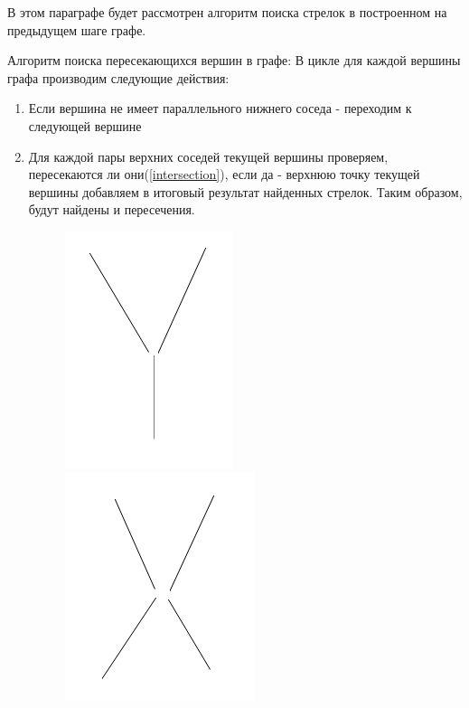В этом параграфе будет рассмотрен алгоритм поиска стрелок в построенном на предыдущем шаге графе. 

Алгоритм поиска пересекающихся вершин в графе: \newline
В цикле для каждой вершины графа производим следующие действия:
\begin{enumerate}
	\item Если вершина не имеет параллельного нижнего соседа - переходим к следующей вершине
	\item Для каждой пары верхних соседей текущей вершины проверяем, пересекаются ли они(\ref{intersection}), если да - верхнюю точку текущей вершины добавляем в итоговый результат найденных стрелок. Таким образом, будут найдены  и  пересечения.
	\begin{figure}[!h]
		\centering
		\begin{minipage}{0.45\textwidth}
			\centering
			\includegraphics[width=0.7\linewidth,height=0.7\linewidth]{pictures/Y_cross}
			\caption[Y]{}
			\label{fig:ycross}
		\end{minipage}
		\begin{minipage}{0.45\textwidth}
			\centering
			\includegraphics[width=0.7\linewidth,height=0.7\linewidth]{pictures/X_cross}
			\caption[X]{}
			\label{fig:xcross}
		\end{minipage}
	\end{figure}
	

\end{enumerate}
